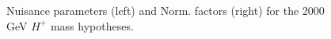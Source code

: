 \begin{figure}[H]
  \centering
  \caption{Nuisance parameters (left) and Norm. factors (right) for the 2000 GeV $H^{+}$ mass hypotheses.}
  \label{fig:Prefit_Hp2000_Blind}
\end{figure}
